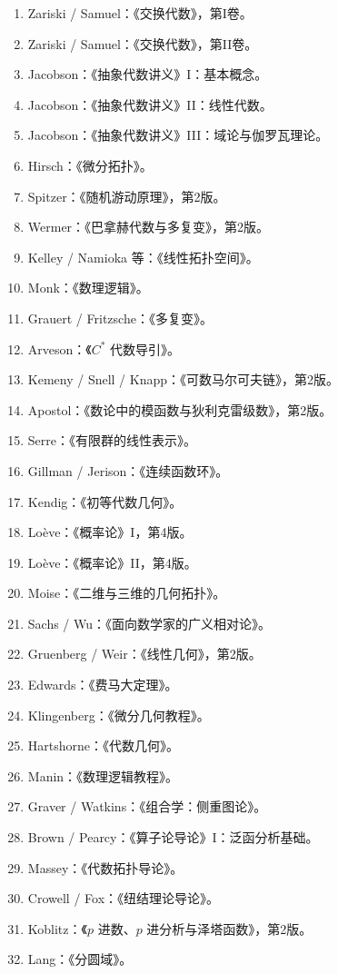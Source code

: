 \begin{enumerate}[leftmargin=3em,label=\arabic*.]
\item Zariski / Samuel：《交换代数》，第I卷。
\item Zariski / Samuel：《交换代数》，第II卷。
\item Jacobson：《抽象代数讲义》I：基本概念。
\item Jacobson：《抽象代数讲义》II：线性代数。
\item Jacobson：《抽象代数讲义》III：域论与伽罗瓦理论。
\item Hirsch：《微分拓扑》。
\item Spitzer：《随机游动原理》，第2版。
\item Wermer：《巴拿赫代数与多复变》，第2版。
\item Kelley / Namioka 等：《线性拓扑空间》。
\item Monk：《数理逻辑》。
\item Grauert / Fritzsche：《多复变》。
\item Arveson：《$C^*$ 代数导引》。
\item Kemeny / Snell / Knapp：《可数马尔可夫链》，第2版。
\item Apostol：《数论中的模函数与狄利克雷级数》，第2版。
\item Serre：《有限群的线性表示》。
\item Gillman / Jerison：《连续函数环》。
\item Kendig：《初等代数几何》。
\item Loève：《概率论》I，第4版。
\item Loève：《概率论》II，第4版。
\item Moise：《二维与三维的几何拓扑》。
\item Sachs / Wu：《面向数学家的广义相对论》。
\item Gruenberg / Weir：《线性几何》，第2版。
\item Edwards：《费马大定理》。
\item Klingenberg：《微分几何教程》。
\item Hartshorne：《代数几何》。
\item Manin：《数理逻辑教程》。
\item Graver / Watkins：《组合学：侧重图论》。
\item Brown / Pearcy：《算子论导论》I：泛函分析基础。
\item Massey：《代数拓扑导论》。
\item Crowell / Fox：《纽结理论导论》。
\item Koblitz：《$p$ 进数、$p$ 进分析与泽塔函数》，第2版。
\item Lang：《分圆域》。

\end{enumerate}
